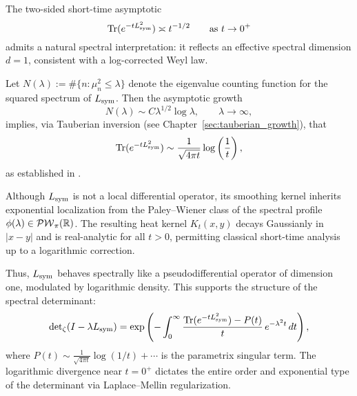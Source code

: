 \begin{remark}
\label{rem:spectral_dimension}
The two-sided short-time asymptotic
\[
\operatorname{Tr}(e^{-t L_{\mathrm{sym}}^2}) \asymp t^{-1/2} \qquad \text{as } t \to 0^+
\]
admits a natural spectral interpretation: it reflects an effective spectral dimension \( d = 1 \), consistent with a log-corrected Weyl law.

\medskip
\noindent
Let \( N(\lambda) := \#\{ n : \mu_n^2 \le \lambda \} \) denote the eigenvalue counting function for the squared spectrum of \( L_{\mathrm{sym}} \). Then the asymptotic growth
\[
N(\lambda) \sim C \lambda^{1/2} \log \lambda, \qquad \lambda \to \infty,
\]
implies, via Tauberian inversion (see Chapter~\ref{sec:tauberian_growth}), that
\[
\operatorname{Tr}(e^{-t L_{\mathrm{sym}}^2}) \sim \frac{1}{\sqrt{4\pi t}} \log\left( \frac{1}{t} \right),
\]
as established in .

\medskip
\noindent
Although \( L_{\mathrm{sym}} \) is not a local differential operator, its smoothing kernel inherits exponential localization from the Paley--Wiener class of the spectral profile \( \phi(\lambda) \in \mathcal{PW}_{\pi}(\mathbb{R}) \). The resulting heat kernel \( K_t(x,y) \) decays Gaussianly in \( |x - y| \) and is real-analytic for all \( t > 0 \), permitting classical short-time analysis up to a logarithmic correction.

\medskip
\noindent
Thus, \( L_{\mathrm{sym}} \) behaves spectrally like a pseudodifferential operator of dimension one, modulated by logarithmic density. This supports the structure of the spectral determinant:
\[
\det\nolimits_\zeta(I - \lambda L_{\mathrm{sym}}) = \exp\left( - \int_0^\infty \frac{\operatorname{Tr}(e^{-t L_{\mathrm{sym}}^2}) - P(t)}{t} \, e^{-\lambda^2 t} \, dt \right),
\]
where \( P(t) \sim \frac{1}{\sqrt{4\pi t}} \log(1/t) + \cdots \) is the parametrix singular term. The logarithmic divergence near \( t = 0^+ \) dictates the entire order and exponential type of the determinant via Laplace--Mellin regularization.
\end{remark}
